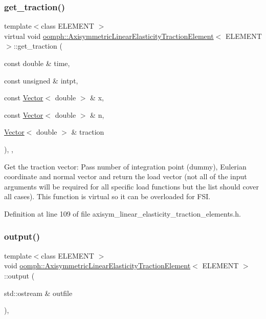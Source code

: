 \subsubsection{\texorpdfstring{get\+\_\+traction()}{get\_traction()}}
{\footnotesize\ttfamily template$<$class E\+L\+E\+M\+E\+NT $>$ \\
virtual void \hyperlink{classoomph_1_1AxisymmetricLinearElasticityTractionElement}{oomph\+::\+Axisymmetric\+Linear\+Elasticity\+Traction\+Element}$<$ E\+L\+E\+M\+E\+NT $>$\+::get\+\_\+traction (\begin{DoxyParamCaption}\item[{const double \&}]{time,  }\item[{const unsigned \&}]{intpt,  }\item[{const \hyperlink{classoomph_1_1Vector}{Vector}$<$ double $>$ \&}]{x,  }\item[{const \hyperlink{classoomph_1_1Vector}{Vector}$<$ double $>$ \&}]{n,  }\item[{\hyperlink{classoomph_1_1Vector}{Vector}$<$ double $>$ \&}]{traction }\end{DoxyParamCaption})\hspace{0.3cm}{\ttfamily [inline]}, {\ttfamily [protected]}, {\ttfamily [virtual]}}



Get the traction vector\+: Pass number of integration point (dummy), Eulerian coordinate and normal vector and return the load vector (not all of the input arguments will be required for all specific load functions but the list should cover all cases). This function is virtual so it can be overloaded for F\+SI. 



Definition at line 109 of file axisym\+\_\+linear\+\_\+elasticity\+\_\+traction\+\_\+elements.\+h.

\mbox{\label{classoomph_1_1AxisymmetricLinearElasticityTractionElement_a5823855e2697fcf80ab41378d29cff5b}} 
\subsubsection{\texorpdfstring{output()}{output()}\hspace{0.1cm}{\footnotesize\ttfamily [1/4]}}
{\footnotesize\ttfamily template$<$class E\+L\+E\+M\+E\+NT $>$ \\
void \hyperlink{classoomph_1_1AxisymmetricLinearElasticityTractionElement}{oomph\+::\+Axisymmetric\+Linear\+Elasticity\+Traction\+Element}$<$ E\+L\+E\+M\+E\+NT $>$\+::output (\begin{DoxyParamCaption}\item[{std\+::ostream \&}]{outfile }\end{DoxyParamCaption})\hspace{0.3cm}{\ttfamily [inline]}, {\ttfamily [virtual]}}



